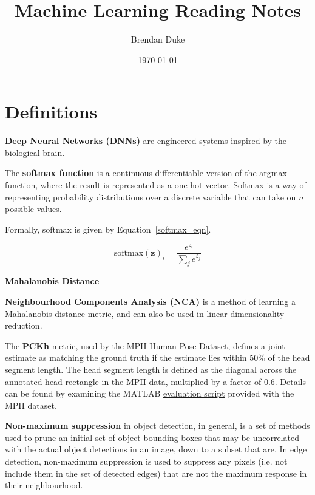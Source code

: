 \documentclass[a4paper, 12pt]{article}
\date{\today}
\title{Machine Learning Reading Notes}
\author{Brendan Duke}
\begin{document}
\maketitle

\section{Definitions}

\textbf{Deep Neural Networks (DNNs)} are engineered systems inspired by the
biological brain\cite{Goodfellow-et-al-2016-Book}.

The \textbf{softmax function} is a continuous differentiable version of the
argmax function, where the result is represented as a one-hot
vector\cite[Chapter~6]{Goodfellow-et-al-2016-Book}. Softmax is a way of
representing probability distributions over a discrete variable that can take
on $n$ possible values.

Formally, softmax is given by Equation~\ref{softmax_eqn}.

\begin{equation}
        \textrm{softmax}(\boldsymbol{z})_i = \frac{e^{z_i}}{\sum_je^{z_j}}
        \label{softmax_eqn}
\end{equation}

\textbf{Mahalanobis Distance}

\textbf{Neighbourhood Components Analysis (NCA)} is a method of learning a
Mahalanobis distance metric, and can also be used in linear dimensionality
reduction\cite{NIPS2004_2566}.

The \textbf{PCKh} metric, used by the MPII Human Pose Dataset, defines a joint
estimate as matching the ground truth if the estimate lies within 50\% of the
head segment length\cite{andriluka-2d-2014-853}. The head segment length is
defined as the diagonal across the annotated head rectangle in the MPII data,
multiplied by a factor of 0.6. Details can be found by examining the MATLAB
\href{http://human-pose.mpi-inf.mpg.de/results/mpii_human_pose/evalMPII.zip}{evaluation script}
provided with the MPII dataset.

\label{nonmax_supression}
\textbf{Non-maximum suppression} in object detection, in general, is a set of
methods used to prune an initial set of object bounding boxes that may be
uncorrelated with the actual object detections in an image, down to a subset
that are\cite{DBLP:conf/accv/RotheGG14}. In edge detection, non-maximum
suppression is used to suppress any pixels (i.e. not include them in the set of
detected edges) that are not the maximum response in their neighbourhood.
\end{document}
